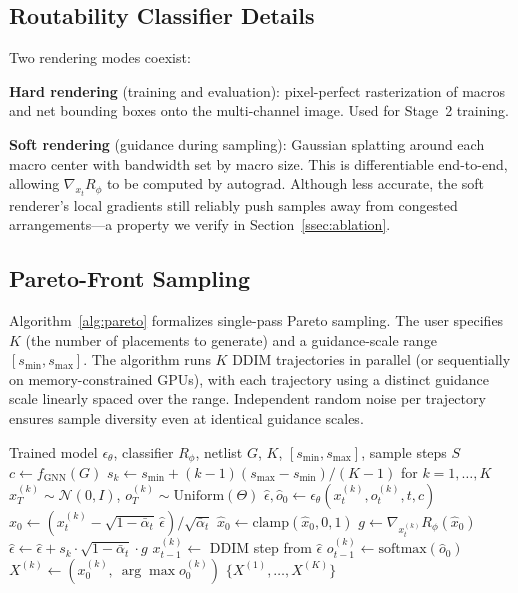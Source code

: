 \subsection{Routability Classifier Details}
\label{ssec:routability}

Two rendering modes coexist:

\textbf{Hard rendering} (training and evaluation): pixel-perfect rasterization of macros and net bounding boxes onto the multi-channel image. Used for Stage~2 training.

\textbf{Soft rendering} (guidance during sampling): Gaussian splatting around each macro center with bandwidth set by macro size. This is differentiable end-to-end, allowing $\nabla_{x_t} R_\phi$ to be computed by autograd. Although less accurate, the soft renderer's local gradients still reliably push samples away from congested arrangements—a property we verify in Section~\ref{ssec:ablation}.

\subsection{Pareto-Front Sampling}
\label{ssec:pareto}

Algorithm~\ref{alg:pareto} formalizes single-pass Pareto sampling. The user specifies $K$ (the number of placements to generate) and a guidance-scale range $[s_\textrm{min}, s_\textrm{max}]$. The algorithm runs $K$ DDIM trajectories in parallel (or sequentially on memory-constrained GPUs), with each trajectory using a distinct guidance scale linearly spaced over the range. Independent random noise per trajectory ensures sample diversity even at identical guidance scales.

\begin{algorithm}[t]
\caption{PareDiff Pareto-Front Sampling}
\label{alg:pareto}
\begin{algorithmic}[1]
\REQUIRE Trained model $\epsilon_\theta$, classifier $R_\phi$, netlist $G$, $K$, $[s_\textrm{min}, s_\textrm{max}]$, sample steps $S$
\STATE $c \leftarrow f_\textrm{GNN}(G)$
\STATE $s_k \leftarrow s_\textrm{min} + (k-1)(s_\textrm{max} - s_\textrm{min})/(K-1)$ for $k = 1, \dots, K$
    \STATE $x_T^{(k)} \sim \mathcal{N}(0, I)$, \quad $o_T^{(k)} \sim \textrm{Uniform}(\Theta)$
        \STATE $\hat\epsilon, \hat{o}_0 \leftarrow \epsilon_\theta(x_t^{(k)}, o_t^{(k)}, t, c)$
        \STATE $\hat{x}_0 \leftarrow (x_t^{(k)} - \sqrt{1 - \bar{\alpha}_t}\,\hat\epsilon) / \sqrt{\bar{\alpha}_t}$
        \STATE $\hat{x}_0 \leftarrow \textrm{clamp}(\hat{x}_0, 0, 1)$ 
        \STATE $g \leftarrow \nabla_{x_t^{(k)}} R_\phi(\hat{x}_0)$ 
        \STATE $\hat\epsilon \leftarrow \hat\epsilon + s_k \cdot \sqrt{1 - \bar{\alpha}_t} \cdot g$
        \STATE $x_{t-1}^{(k)} \leftarrow$ DDIM step from $\hat\epsilon$
        \STATE $o_{t-1}^{(k)} \leftarrow \textrm{softmax}(\hat{o}_0)$
    \ENDFOR
    \STATE $X^{(k)} \leftarrow (x_0^{(k)},\ \arg\max o_0^{(k)})$
\ENDFOR
\RETURN $\{X^{(1)}, \dots, X^{(K)}\}$
\end{algorithmic}
\end{algorithm}

